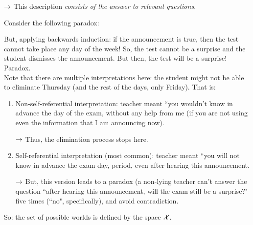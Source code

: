 $\rightarrow$ This description {\it consists of the answer to relevant questions}. \\


Consider the following paradox:


But, applying backwards induction: if the announcement is true, then the test cannot take place any day of the week! So, the test cannot be a surprise and the student dismisses the announcement. But then, the test will be a surprise! Paradox. \\

Note that there are multiple interpretations here: the student might not be able to eliminate Thursday (and the rest of the days, only Friday). That is:
\begin{enumerate}
    \item Non-self-referential interpretation: teacher meant ``you wouldn't know in advance the day of the exam, without any help from me (if you are not using even the information that I am announcing now).
    
    $\rightarrow$ Thus, the elimination process stops here.
    
    \item Self-referential interpretation (most common): teacher meant ``you will not know in advance the exam day, period, even after hearing this announcement.
    
    $\rightarrow$ But, this version leads to a paradox (a non-lying teacher can't answer the question ``after hearing this announcement, will the exam still be a surprise?" five times (``no", specifically), and avoid contradiction.
\end{enumerate}



So: the set of possible worlds is defined by the space $\mathcal{X}$. \\

